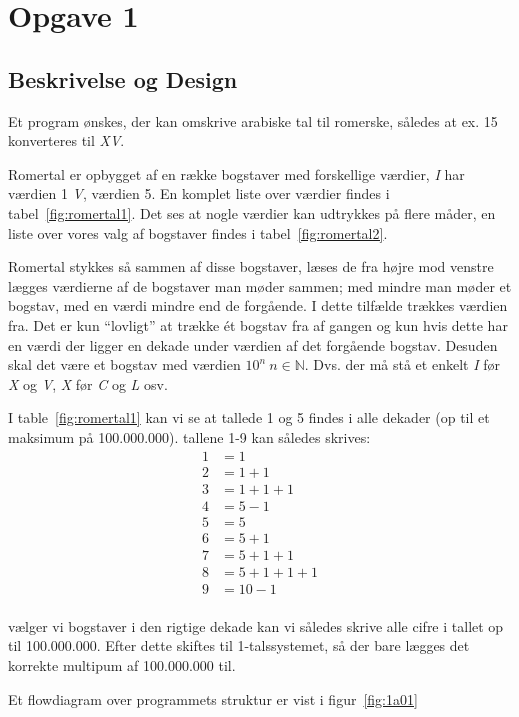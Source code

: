\section{Opgave 1}
\subsection{Beskrivelse og Design}
	Et program ønskes, der kan omskrive arabiske tal til romerske,
	således at ex. 15 konverteres til \emph{XV}.
	
	Romertal er opbygget af en række bogstaver med forskellige værdier,
	\emph{I} har værdien 1 \emph{V}, værdien 5. En komplet liste over værdier findes i tabel~\ref{fig:romertal1}.
	Det ses at nogle værdier kan udtrykkes på flere måder, en liste over vores valg af bogstaver findes i tabel~\ref{fig:romertal2}.
	
	Romertal stykkes så sammen af disse bogstaver, læses de fra højre mod venstre lægges værdierne af de bogstaver man møder sammen;
	med mindre man møder et bogstav, med en værdi mindre end de forgående. I dette tilfælde trækkes værdien fra.
	Det er kun ``lovligt'' at trække ét bogstav fra af gangen og kun hvis dette har en værdi der ligger en dekade under værdien af det forgående bogstav.
	Desuden skal det være et bogstav med værdien $10^n~n\in\mathbb{N}$.
	Dvs. der må stå et enkelt \emph{I} før \emph{X} og \emph{V}, \emph{X} før \emph{C} og \emph{L} osv.
	
	I table~\ref{fig:romertal1} kan vi se at tallede 1 og 5 findes i alle dekader (op til et maksimum på 100.000.000).
	tallene 1-9 kan således skrives:
	\begin{align*}
		1 &= 1\\
		2 &= 1 + 1\\
		3 &= 1 + 1 + 1\\
		4 &= 5 - 1\\
		5 &= 5\\
		6 &= 5 + 1\\
		7 &= 5 + 1 + 1\\
		8 &= 5 + 1 + 1 + 1\\
		9 &= 10 - 1\\
	\end{align*}
	
	vælger vi bogstaver i den rigtige dekade kan vi således skrive alle cifre i tallet op til 100.000.000.
	Efter dette skiftes til 1-talssystemet, så der bare lægges det korrekte multipum af 100.000.000 til.
	
	Et flowdiagram over programmets struktur er vist i figur~\ref{fig:1a01}
	
